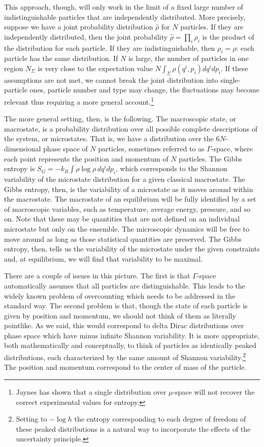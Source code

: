 \documentclass[iopart]{revtex4-1}
\begin{document}
This approach, though, will only work in the limit of a fixed large number of indistinguishable particles that are independently distributed. More precisely, suppose we have a joint probability distribution $\hat{\rho}$ for $N$ particles. If they are independently distributed, then the joint probability $\hat{\rho}=\prod_{i}\rho_i$ is the product of the distribution for each particle. If they are indistinguishable, then $\rho_i=\rho$: each particle has the same distribution. If $N$ is large, the number of particles in one region $N_\Sigma$ is very close to the expectation value $N\int_\Sigma \rho(q^i, p_i)dq^idp_i$. If these assumptions are not met, we cannot break the joint distribution into single-particle ones, particle number and type may change, the fluctuations may become relevant thus requiring a more general account.\footnote{Jaynes\cite{Jaynes} has shown that a single distribution over $\mu$-space will not recover the correct experimental values for entropy.}

The more general setting, then, is the following. The macroscopic state, or macrostate, is a probability distribution over all possible complete descriptions of the system, or microstates. That is, we have a distribution over the $6N$-dimensional phase space of $N$ particles, sometimes referred to as $\Gamma$-space, where each point represents the position and momentum of $N$ particles. The Gibbs entropy is $S_G = -k_B \int \rho \log \rho \, dq^idp_i$, which corresponds to the Shannon variability of the microstate distribution for a given classical macrostate. The Gibbs entropy, then, is the variability of a microstate as it moves around within the macrostate. The macrostate of an equilibrium will be fully identified by a set of macroscopic variables, such as temperature, average energy, pressure, and so on. Note that these may be quantities that are not defined on an individual microstate but only on the ensemble. The microscopic dynamics will be free to move around as long as those statistical quantities are preserved. The Gibbs entropy, then, tells us the variability of the microstate under the given constraints and, at equilibrium, we will find that variability to be maximal.

There are a couple of issues in this picture. The first is that $\Gamma$-space automatically assumes that all particles are distinguishable. This leads to the widely known problem of overcounting which needs to be addressed in the standard way. The second problem is that, though the state of each particle is given by position and momentum, we should not think of them as literally pointlike. As we said, this would correspond to delta Dirac distributions over phase space which have minus infinite Shannon variability. It is more appropriate, both mathematically and conceptually, to think of particles as identically peaked distributions, each characterized by the same amount of Shannon variability.\footnote{Setting to $-\log h$ the entropy corresponding to each degree of freedom of these peaked distributions is a natural way to incorporate the effects of the uncertainty principle.} The position and momentum correspond to the center of mass of the particle.
\end{document}
